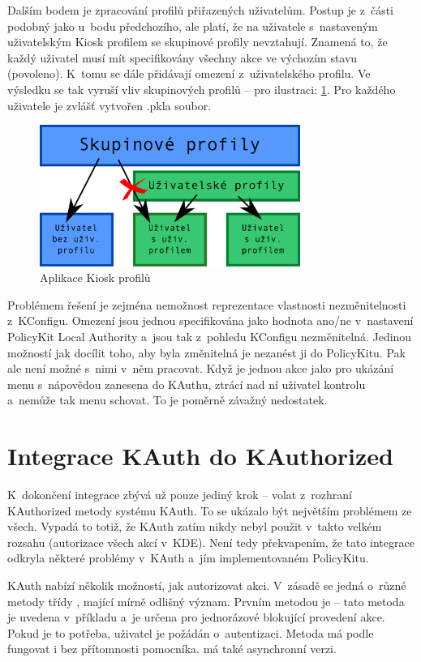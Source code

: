 Dalším bodem je zpracování profilů přiřazených uživatelům. Postup je z~části podobný jako u~bodu předchozího, ale platí, že na uživatele s~nastaveným uživatelským Kiosk profilem se skupinové profily nevztahují. Znamená to, že každý uživatel musí mít specifikovány všechny akce ve výchozím stavu (povoleno). K~tomu se dále přidávají omezení z~uživatelského profilu. Ve výsledku se tak vyruší vliv skupinových profilů -- pro ilustraci: \ref{fig:konv_profily}. Pro každého uživatele je zvlášť vytvořen .pkla soubor.

\begin{figure}[h]
    \centering
    \includegraphics[width=8.5cm]{obrazky/profily.pdf}
    \caption{Aplikace Kiosk profilů}
    \label{fig:konv_profily}
\end{figure}

Problémem řešení je zejména nemožnost reprezentace vlastnosti nezměnitelnosti z~KConfigu. Omezení jsou jednou specifikována jako hodnota ano/ne v~nastavení PolicyKit Local Authority a~jsou tak z~pohledu KConfigu nezměnitelná. Jedinou možností jak docílit toho, aby byla změnitelná je nezanést ji do PolicyKitu. Pak ale není možné s~nimi v~něm pracovat. Když je jednou akce jako  pro ukázání menu s~nápovědou zanesena do KAuthu, ztrácí nad ní uživatel kontrolu a~nemůže tak menu schovat. To je poměrně závažný nedostatek.

\section{Integrace KAuth do KAuthorized}
K~dokončení integrace zbývá už pouze jediný krok -- volat z~rozhraní KAuthorized metody systému KAuth. To se ukázalo být největším problémem ze všech. Vypadá to totiž, že KAuth zatím nikdy nebyl použit v~takto velkém rozsahu (autorizace všech akcí v~KDE). Není tedy překvapením, že tato integrace odkryla některé problémy v~KAuth a~jím implementovaném PolicyKitu.

KAuth nabízí několik možností, jak autorizovat akci. V~zásadě se jedná o~různé metody třídy , mající mírně odlišný význam. Prvním metodou je  -- tato metoda je uvedena v~příkladu \cite{Kauth-usage} a~je určena pro jednorázové blokující provedení akce. Pokud je to potřeba, uživatel je požádán o~autentizaci. Metoda má podle \cite{Kauth-usage} fungovat i bez přítomnosti pomocníka.  má také asynchronní verzi.

